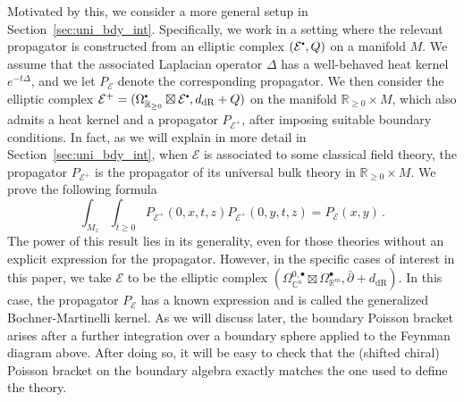 \documentclass[11pt]{article}
\newcommand{\C}{\mathbb{C}}
\newcommand{\R}{\mathbb{R}}
\newcommand{\derham}{\mathrm{dR}}
\newcommand\sbullet[1][.5]{\mathbin{\vcenter{\hbox{\scalebox{#1}{$\bullet$}}}}}
\numberwithin{equation}{section}
\begin{document}
Motivated by this, we consider a more general setup in Section~\ref{sec:uni_bdy_int}. Specifically, we work in a setting where the relevant propagator is constructed from an elliptic complex $(\mathcal{E}^{\sbullet},Q)$ on a manifold $M$. We assume that the associated Laplacian operator $\Delta$ has a well-behaved heat kernel $e^{-t\Delta}$, and we let $P_{\mathcal{E}}$ denote the corresponding propagator. We then consider the elliptic complex $\mathcal{E}^+ = (\Omega^{\sbullet}_{\R_{\geq 0}}\boxtimes \mathcal{E}^{\sbullet},d_{\derham} + Q )$ on the manifold $\R_{\geq 0}\times M$, which also admits a heat kernel and a propagator $P_{\mathcal{E}^+}$, after imposing suitable boundary conditions. In fact, as we will explain in more detail in Section~\ref{sec:uni_bdy_int}, when $\mathcal{E}$ is associated to some classical field theory, the propagator $P_{\mathcal{E}^+}$ is the propagator of its universal bulk theory in $\R_{\geq 0} \times M $. We prove the following formula
	\begin{equation}\label{eq:bulk_to_bdy}
		\int_{M_z}\int_{t \geq 0}P_{\mathcal{E}^+}(0,x,t,z)P_{\mathcal{E}^+}(0,y,t,z) = P_{\mathcal{E}}(x,y)\,.
	\end{equation}
The power of this result lies in its generality, even for those theories without an explicit expression for the propagator. However, in the specific cases of interest in this paper, we take $\mathcal{E}$ to be the elliptic complex $(\Omega^{0,\bullet}_{\C^n}\boxtimes\Omega^{\bullet}_{\R^m}, \bar{\partial} + d_{\derham})$. In this case, the propagator $P_{\mathcal{E}}$ has a known expression and is called the generalized Bochner-Martinelli kernel. As we will discuss later, the boundary Poisson bracket arises after a further integration over a boundary sphere applied to the Feynman diagram above. After doing so, it will be easy to check that the (shifted chiral) Poisson bracket on the boundary algebra exactly matches the one used to define the theory.
	
\end{document}
